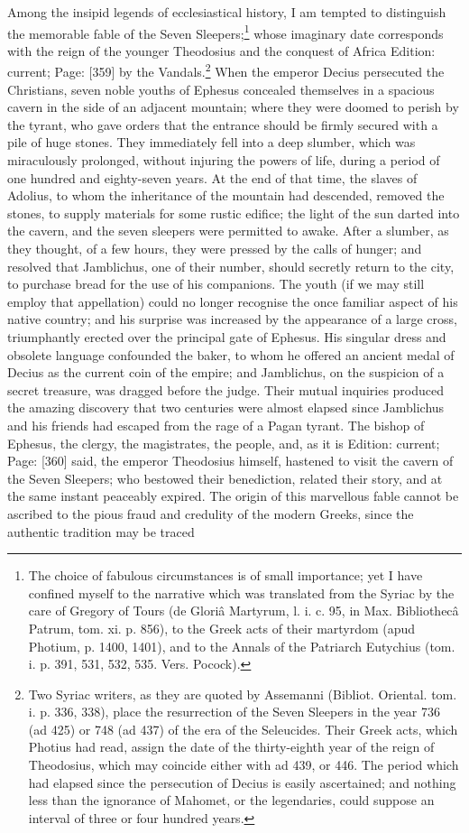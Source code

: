 Among the insipid legends of ecclesiastical history, I am tempted to distinguish the memorable fable of the Seven Sleepers;\footnote{The choice of fabulous circumstances is of small importance; yet I have confined myself to the narrative which was translated from the Syriac by the care of Gregory of Tours (de Gloriâ Martyrum, l. i. c. 95, in Max. Bibliothecâ Patrum, tom. xi. p. 856), to the Greek acts of their martyrdom (apud Photium, p. 1400, 1401), and to the Annals of the Patriarch Eutychius (tom. i. p. 391, 531, 532, 535. Vers. Pocock).} whose imaginary date corresponds with the reign of the younger Theodosius and the conquest of Africa Edition: current; Page: [359] by the Vandals.\footnote{Two Syriac writers, as they are quoted by Assemanni (Bibliot. Oriental. tom. i. p. 336, 338), place the resurrection of the Seven Sleepers in the year 736 (ad 425) or 748 (ad 437) of the era of the Seleucides. Their Greek acts, which Photius had read, assign the date of the thirty-eighth year of the reign of Theodosius, which may coincide either with ad 439, or 446. The period which had elapsed since the persecution of Decius is easily ascertained; and nothing less than the ignorance of Mahomet, or the legendaries, could suppose an interval of three or four hundred years.} When the emperor Decius persecuted the Christians, seven noble youths of Ephesus concealed themselves in a spacious cavern in the side of an adjacent mountain; where they were doomed to perish by the tyrant, who gave orders that the entrance should be firmly secured with a pile of huge stones. They immediately fell into a deep slumber, which was miraculously prolonged, without injuring the powers of life, during a period of one hundred and eighty-seven years. At the end of that time, the slaves of Adolius, to whom the inheritance of the mountain had descended, removed the stones, to supply materials for some rustic edifice; the light of the sun darted into the cavern, and the seven sleepers were permitted to awake. After a slumber, as they thought, of a few hours, they were pressed by the calls of hunger; and resolved that Jamblichus, one of their number, should secretly return to the city, to purchase bread for the use of his companions. The youth (if we may still employ that appellation) could no longer recognise the once familiar aspect of his native country; and his surprise was increased by the appearance of a large cross, triumphantly erected over the principal gate of Ephesus. His singular dress and obsolete language confounded the baker, to whom he offered an ancient medal of Decius as the current coin of the empire; and Jamblichus, on the suspicion of a secret treasure, was dragged before the judge. Their mutual inquiries produced the amazing discovery that two centuries were almost elapsed since Jamblichus and his friends had escaped from the rage of a Pagan tyrant. The bishop of Ephesus, the clergy, the magistrates, the people, and, as it is Edition: current; Page: [360] said, the emperor Theodosius himself, hastened to visit the cavern of the Seven Sleepers; who bestowed their benediction, related their story, and at the same instant peaceably expired. The origin of this marvellous fable cannot be ascribed to the pious fraud and credulity of the modern Greeks, since the authentic tradition may be traced 